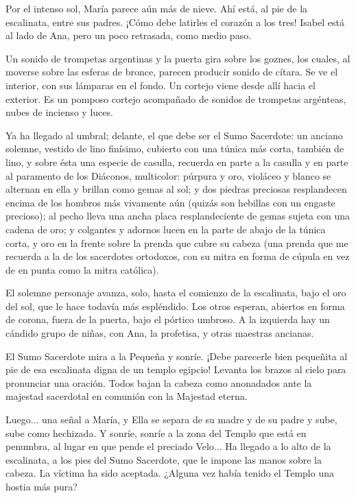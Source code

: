 \documentclass[12pt]{book} %
\begin{document}
Por el intenso sol, María parece aún más de nieve. Ahí está, al pie de la escalinata, entre sus padres. ¡Cómo debe latirles el corazón a los tres! Isabel está al lado de Ana, pero un poco retrasada, como medio paso. 

Un sonido de trompetas argentinas y la puerta gira sobre los goznes, los cuales, al moverse sobre las esferas de bronce, parecen producir sonido de cítara. Se ve el interior, con sus lámparas en el fondo. Un cortejo viene desde allí hacia el exterior. Es un pomposo cortejo acompañado de sonidos de trompetas argénteas, nubes de incienso y luces. 

Ya ha llegado al umbral; delante, el que debe ser el Sumo Sacerdote: un anciano solemne, vestido de lino finísimo, cubierto con una túnica más corta, también de lino, y sobre ésta una especie de casulla, recuerda en parte a la casulla y en parte al paramento de los Diáconos, multicolor: púrpura y oro, violáceo y blanco se alternan en ella y brillan como gemas al sol; y dos piedras preciosas resplandecen encima de los hombros más vivamente aún (quizás son hebillas con un engaste precioso); al pecho lleva una ancha placa resplandeciente de gemas sujeta con una cadena de oro; y colgantes y adornos lucen en la parte de abajo de la túnica corta, y oro en la frente sobre la prenda que cubre su cabeza (una prenda que me recuerda a la de los sacerdotes ortodoxos, con su mitra en forma de cúpula en vez de en punta como la mitra católica). 

El solemne personaje avanza, solo, hasta el comienzo de la escalinata, bajo el oro del sol, que le hace todavía más espléndido. Los otros esperan, abiertos en forma de corona, fuera de la puerta, bajo el pórtico umbroso. A la izquierda hay un cándido grupo de niñas, con Ana, la profetisa, y otras maestras ancianas. 

El Sumo Sacerdote mira a la Pequeña y sonríe. ¡Debe parecerle bien pequeñita al pie de esa escalinata digna de un templo egipcio! Levanta los brazos al cielo para pronunciar una oración. Todos bajan la cabeza como anonadados ante la majestad sacerdotal en comunión con la Majestad eterna. 

Luego... una señal a María, y Ella se separa de su madre y de su padre y sube, sube como hechizada. Y sonríe, sonríe a la zona del Templo que está en penumbra, al lugar en que pende el preciado Velo... Ha llegado a lo alto de la escalinata, a los pies del Sumo Sacerdote, que le impone las manos sobre la cabeza. La víctima ha sido aceptada. ¿Alguna vez había tenido el Templo una hostia más pura? 
\end{document}

